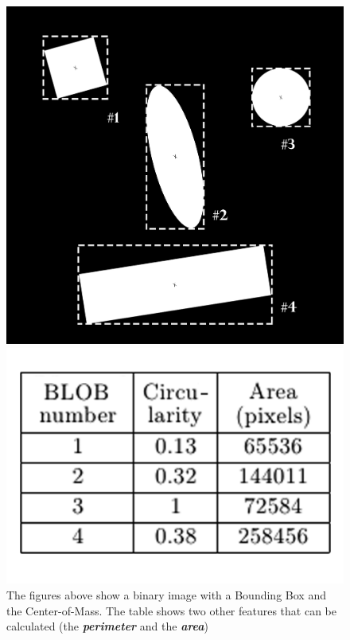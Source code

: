 \begin{figure}[ht]
\begin{minipage}[b]{0.45\linewidth}
\centering
\includegraphics[width=1\textwidth]{Pictures/Theory/binary_image.png}
\end{minipage}
\hspace{0.5cm}	
\begin{minipage}[b]{0.45\linewidth}
\centering
\includegraphics[width=1\textwidth]{Pictures/Theory/binary_image_table.png}
\end{minipage}
\label{fig:BinaryIm}
\caption{The figures above show a binary image with a Bounding Box and the Center-of-Mass. The table shows two other features that can be calculated (the \textbf{\textit{perimeter}} and the \textbf{\textit{area}})}
\end{figure}

